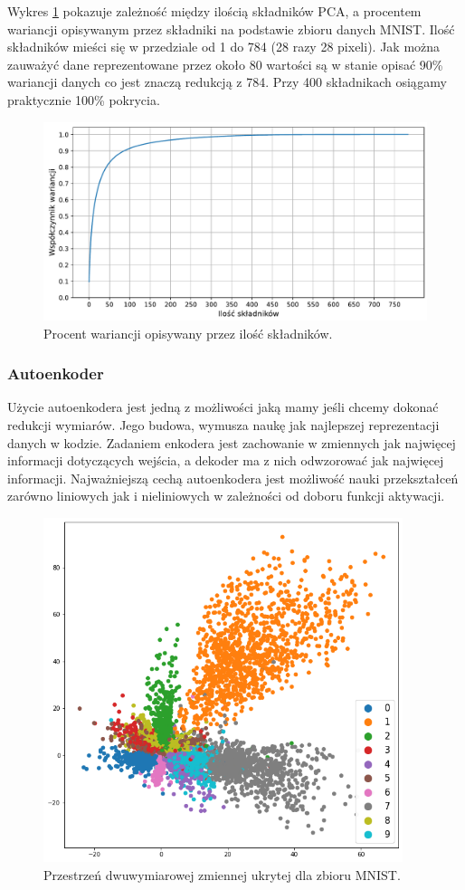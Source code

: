 \documentclass[a4paper,12pt]{book} %
\begin{document}
Wykres \ref{fig:pcacumsum} pokazuje zależność między ilością składników PCA, a procentem wariancji opisywanym przez składniki na podstawie zbioru danych MNIST. Ilość składników mieści się w przedziale od 1 do 784 (28 razy 28 pixeli). Jak można zauważyć dane reprezentowane przez około 80 wartości są w stanie opisać 90\% wariancji danych co jest znaczą redukcją z 784. Przy 400 składnikach osiągamy praktycznie 100\% pokrycia. 
\begin{figure}[h!]
	\centering
	\includegraphics[width=\textwidth]{pcacumsum.pdf}
	\caption{Procent wariancji opisywany przez ilość składników.}
	\label{fig:pcacumsum}
\end{figure}
\subsubsection{Autoenkoder}
Użycie autoenkodera jest jedną z możliwości jaką mamy jeśli chcemy dokonać redukcji wymiarów. Jego budowa, wymusza naukę jak najlepszej reprezentacji danych w kodzie. Zadaniem enkodera jest zachowanie w zmiennych jak najwięcej informacji dotyczących wejścia, a dekoder ma z nich odwzorować jak najwięcej informacji. Najważniejszą cechą autoenkodera jest możliwość nauki przekształceń zarówno liniowych jak i nieliniowych w zależności od doboru funkcji aktywacji.
\begin{figure}[h!]
	\centering
	\includegraphics[width=10.5cm]{pictures/aelatentspace.png}
	\caption{Przestrzeń dwuwymiarowej zmiennej ukrytej dla zbioru MNIST.}
	\label{fig:latentspaceae}
\end{figure}
\end{document}
